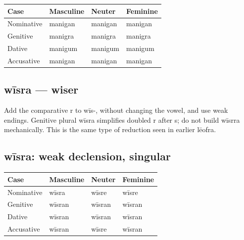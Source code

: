 \par\begingroup
\fontsize{10.5}{13.2}\selectfont
\setlength{\LTleft}{0pt}\setlength{\LTright}{\fill}
\noindent
\begin{tabular}{@{}>{\raggedright\arraybackslash}p{28.89mm}>{\raggedright\arraybackslash}p{28.89mm}>{\raggedright\arraybackslash}p{28.89mm}>{\raggedright\arraybackslash}p{28.89mm}@{}}
\toprule
\textbf{Case} & \textbf{Masculine} & \textbf{Neuter} & \textbf{Feminine} \\
\midrule
Nominative & manigan & manigan & manigan \\
Genitive & manigra & manigra & manigra \\
Dative & manigum & manigum & manigum \\
Accusative & manigan & manigan & manigan \\
\bottomrule
\end{tabular}
\par\endgroup

\subsection*{wīsra — wiser}

Add the comparative r to wīs-, without changing the vowel, and use weak endings. Genitive plural wīsra simplifies doubled r after s; do not build wīsrra mechanically. This is the same type of reduction seen in earlier lēofra.

\subsection*{wīsra: weak declension, singular}

\par\begingroup
\fontsize{10.5}{13.2}\selectfont
\setlength{\LTleft}{0pt}\setlength{\LTright}{\fill}
\noindent
\begin{tabular}{@{}>{\raggedright\arraybackslash}p{28.89mm}>{\raggedright\arraybackslash}p{28.89mm}>{\raggedright\arraybackslash}p{28.89mm}>{\raggedright\arraybackslash}p{28.89mm}@{}}
\toprule
\textbf{Case} & \textbf{Masculine} & \textbf{Neuter} & \textbf{Feminine} \\
\midrule
Nominative & wīsra & wīsre & wīsre \\
Genitive & wīsran & wīsran & wīsran \\
Dative & wīsran & wīsran & wīsran \\
Accusative & wīsran & wīsre & wīsran \\
\bottomrule
\end{tabular}
\par\endgroup

